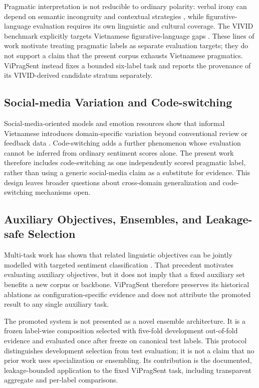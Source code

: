 Pragmatic interpretation is not reducible to ordinary polarity: verbal irony can depend on semantic incongruity and contextual strategies \citep{ghosh-etal-2020-interpreting}, while figurative-language evaluation requires its own linguistic and cultural coverage. The VIVID benchmark explicitly targets Vietnamese figurative-language gaps \citep{rem-lab-2026-vivid}. These lines of work motivate treating pragmatic labels as separate evaluation targets; they do not support a claim that the present corpus exhausts Vietnamese pragmatics. ViPragSent instead fixes a bounded six-label task and reports the provenance of its VIVID-derived candidate stratum separately.

\subsection{Social-media Variation and Code-switching}

Social-media-oriented models and emotion resources show that informal Vietnamese introduces domain-specific variation beyond conventional review or feedback data \citep{nguyen-etal-2023-visobert,ho-etal-2020-uit-vsmec,tran-etal-2026-vigoemotions}. Code-switching adds a further phenomenon whose evaluation cannot be inferred from ordinary sentiment scores alone. The present work therefore includes code-switching as one independently scored pragmatic label, rather than using a generic social-media claim as a substitute for evidence. This design leaves broader questions about cross-domain generalization and code-switching mechanisms open.

\subsection{Auxiliary Objectives, Ensembles, and Leakage-safe Selection}

Multi-task work has shown that related linguistic objectives can be jointly modelled with targeted sentiment classification \citep{moore-barnes-2021-multi}. That precedent motivates evaluating auxiliary objectives, but it does not imply that a fixed auxiliary set benefits a new corpus or backbone. ViPragSent therefore preserves its historical ablations as configuration-specific evidence and does not attribute the promoted result to any single auxiliary task.

The promoted system is not presented as a novel ensemble architecture. It is a frozen label-wise composition selected with five-fold development out-of-fold evidence and evaluated once after freeze on canonical test labels. This protocol distinguishes development selection from test evaluation; it is not a claim that no prior work uses specialization or ensembling. Its contribution is the documented, leakage-bounded application to the fixed ViPragSent task, including transparent aggregate and per-label comparisons.

